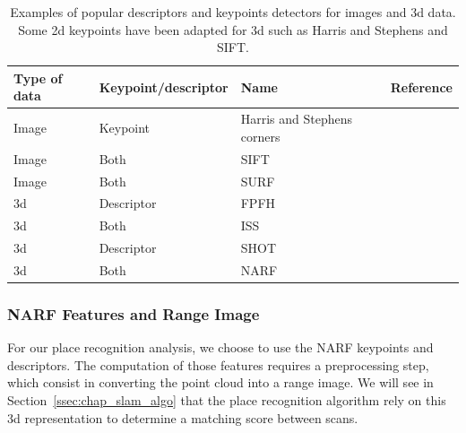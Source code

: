 \begin{table}[H]
    \centering
    \begin{tabular}{@{}llll@{}}
        \toprule
        \textbf{Type of data}  & \textbf{Keypoint/descriptor} & \textbf{Name}               & \textbf{Reference} \\
        \hline
        Image                  & Keypoint                     & Harris and Stephens corners & \cite{Harris1988}  \\
        Image                  & Both                         & SIFT                        & \cite{Lowe2004}    \\
        Image                  & Both                         & SURF                        & \cite{Bay2006}     \\
        \gls*{3d}              & Descriptor                   & FPFH                        & \cite{Rusu2009}    \\
        \gls*{3d}              & Both                         & ISS                         & \cite{Yu2009}      \\
        \gls*{3d}              & Descriptor                   & SHOT                        & \cite{Tombari2010} \\
        \gls*{3d}              & Both                         & NARF                        & \cite{Steder2011a} \\
        \bottomrule
    \end{tabular}
    \caption{ Examples of popular descriptors and keypoints detectors for images and \gls*{3d} data. Some \gls*{2d} keypoints have been adapted for \gls*{3d} such as Harris and Stephens and SIFT.}
    \label{tab:chap_slam_features_examples}
\end{table}

\subsubsection{NARF Features and Range Image}
\label{ssub:NARF Features and Range Image}

For our place recognition analysis, we choose to use the NARF keypoints and descriptors. The computation of those features requires a preprocessing step, which consist in converting the point cloud into a range image. We will see in Section~\ref{ssec:chap_slam_algo} that the place recognition algorithm rely on this \gls*{3d} representation to determine a matching score between scans.

